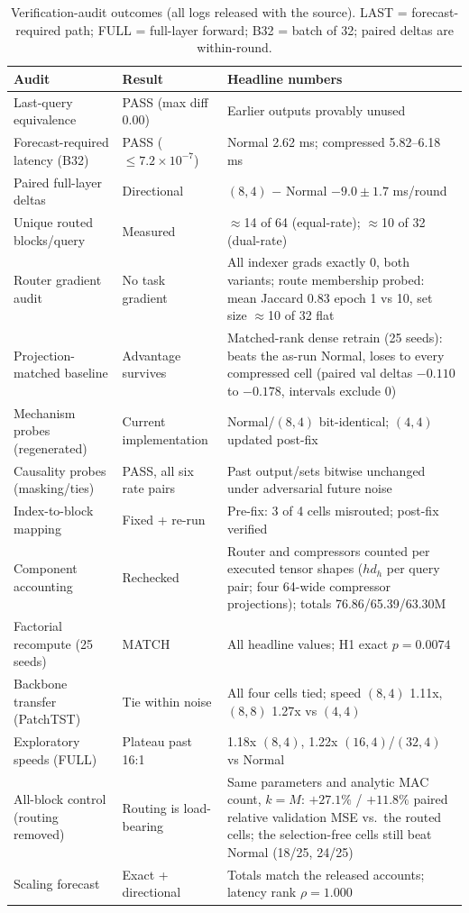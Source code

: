 \begin{table}[t]
\centering
\footnotesize
\caption{Verification-audit outcomes (all logs released with the source). LAST =
forecast-required path; FULL = full-layer forward; B32 = batch of 32; paired
deltas are within-round.}
\label{tab:audits}
\begin{tabular}{@{}llp{}@{}}
\toprule
Audit & Result & Headline numbers \\
\midrule
Last-query equivalence & PASS (max diff 0.00) & Earlier outputs provably unused \\
Forecast-required latency (B32) & PASS ($\le 7.2\times10^{-7}$) &
Normal 2.62 ms; compressed 5.82--6.18 ms \\
Paired full-layer deltas & Directional & $(8,4)$ $-$ Normal $-9.0 \pm 1.7$ ms/round \\
Unique routed blocks/query & Measured & $\approx$14 of 64 (equal-rate); $\approx$10 of 32 (dual-rate) \\
Router gradient audit & No task gradient & All indexer grads exactly 0, both variants; route membership probed: mean Jaccard $0.83$ epoch 1 vs 10, set size $\approx$10 of 32 flat \\
Projection-matched baseline & Advantage survives & Matched-rank dense retrain (25 seeds): beats the as-run Normal, loses to every compressed cell (paired val deltas $-0.110$ to $-0.178$, intervals exclude 0) \\
Mechanism probes (regenerated) & Current implementation & Normal/$(8,4)$ bit-identical; $(4,4)$ updated post-fix \\
Causality probes (masking/ties) & PASS, all six rate pairs & Past output/sets bitwise unchanged under adversarial future noise \\
Index-to-block mapping & Fixed + re-run & Pre-fix: 3 of 4 cells misrouted; post-fix verified \\
Component accounting & Rechecked & Router and compressors counted per executed tensor shapes ($h d_h$ per query pair; four 64-wide compressor projections); totals 76.86/65.39/63.30M \\
Factorial recompute (25 seeds) & MATCH & All headline values; H1 exact $p = 0.0074$ \\
Backbone transfer (PatchTST) & Tie within noise & All four cells tied; speed $(8,4)$ 1.11x, $(8,8)$ 1.27x vs $(4,4)$ \\
Exploratory speeds (FULL) & Plateau past 16:1 & 1.18x $(8,4)$, 1.22x $(16,4)$/$(32,4)$ vs Normal \\
All-block control (routing removed) & Routing is load-bearing & Same parameters and analytic MAC count, $k{=}M$: $+27.1\%$ / $+11.8\%$ paired relative validation MSE vs.\ the routed cells; the selection-free cells still beat Normal (18/25, 24/25) \\
Scaling forecast & Exact + directional & Totals match the released accounts; latency rank $\rho = 1.000$ \\
\bottomrule
\end{tabular}
\end{table}

